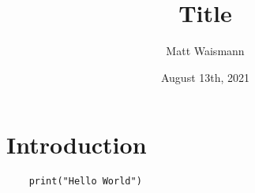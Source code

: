 \documentclass{article}%
\title{Title}
\date{August 13th, 2021}
\author{Matt Waismann}
\begin{document}
\maketitle
\section{Introduction}

\begin{lstlisting}
    print("Hello World")
\end{lstlisting}

\end{document}
